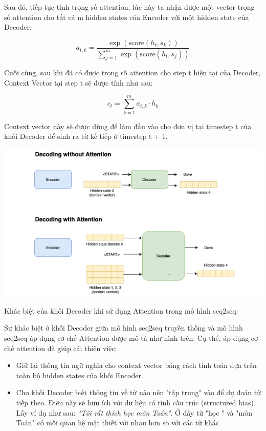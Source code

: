 \documentclass[a4paper, 12pt, openany]{book}
\begin{document}
Sau đó, tiếp tục tính trọng số attention, lúc này ta nhận được một vector trọng số attention cho tất cả m hidden states của Encoder với một hidden state của Decoder:

\begin{equation}
    a_{t,k} = \frac{\exp(\text{{score}}(h_t, s_k))}{\sum_{j=1}^{m} \exp(\text{{score}}(h_t, s_j))}
\end{equation}

Cuối cùng, sau khi đã có được trọng số attention cho step t hiện tại của Decoder, Context Vector tại step t sẽ được tính như sau:

\begin{equation}
    c_t = \sum_{k=1}^{m} a_{t,k} \cdot h_k
\end{equation}


Context vector này sẽ được dùng để làm đầu vào cho đơn vị tại timestep t của khối Decoder để sinh ra từ kế tiếp ở timestep t + 1.

\begin{minipage}{\linewidth}
    \captionsetup{type=figure}
    \centering
    \includegraphics[width=\linewidth]{./assets/images/decoding-attention.png}
    \caption{Khác biệt của khối Decoder khi sử dụng Attention trong mô hình \ac{seq2seq}.}
\end{minipage}
\vspace{0.5cm}

Sự khác biệt ở khối Decoder giữa mô hình \ac{seq2seq} truyền thống và mô hình \ac{seq2seq} áp dụng cơ chế Attention được mô tả như hình trên.
Cụ thể, áp dụng cơ chế attention đã giúp cải thiện việc:

\begin{itemize}
    \item Giữ lại thông tin ngữ nghĩa cho context vector bằng cách tính toán dựa trên toàn bộ hidden states của khối Encoder.
    \item Cho khối Decoder biết thông tin về từ nào nên "tập trung" vào để dự đoán từ tiếp theo. Điều này sẽ hữu ích với dữ liệu có tính cấu trúc (structured bias). Lấy ví dụ như sau: 
    \textit{"Tôi rất thích học môn Toán"}. Ở đây từ "học " và "môn Toán" có mối quan hệ mật thiết với nhau hơn so với các từ khác
\end{itemize}
\end{document}
